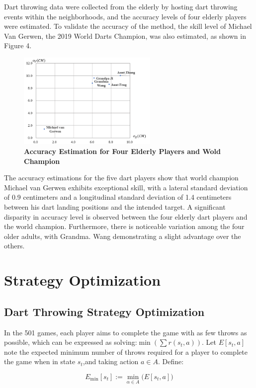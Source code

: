\documentclass[cjjs]{ipart}
\theoremstyle{plain}
\begin{document}
Dart throwing data were collected from the elderly by hosting dart throwing events within the neighborhoods, and the accuracy levels of four elderly players were estimated. To validate the accuracy of the method, the skill level of Michael Van Gerwen, the 2019 World Darts Champion, was also estimated, as shown in Figure 4.

\begin{figure}[h]
    \centering
    \includegraphics[width=0.60\textwidth]{4.png} 
    \caption{\textbf{Accuracy Estimation for Four Elderly Players and Wold Champion}}
    \label{fig:dartboard}
\end{figure}

The accuracy estimations for the five dart players show that world champion Michael van Gerwen exhibits exceptional skill, with a lateral standard deviation of 0.9 centimeters and a longitudinal standard deviation of 1.4 centimeters between his dart landing positions and the intended target.  A significant disparity in accuracy level is observed between the four elderly dart players and the world champion.  Furthermore, there is noticeable variation among the four older adults, with Grandma. Wang demonstrating a slight advantage over the others.

\section{Strategy Optimization}
\subsection{Dart Throwing Strategy Optimization}
In the 501 games, each player aims to complete the game with as few throws as possible, which can be expressed as solving:$\min \left( \sum r(s_t, a) \right)$. Let $E[s_t, a]$ note the expected minimum number of throws required for a player to complete the game when in state $s_t$,and taking action $a \in A$. Define:

\[
E_{\min}[s_t] := \min_{\alpha \in A} \big( E[s_t, a] \big)
\]
\end{document}
